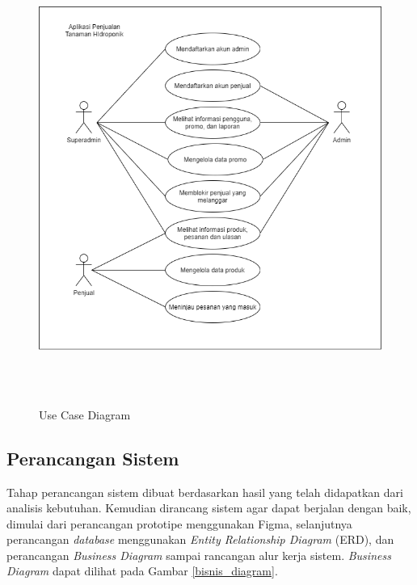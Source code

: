 \begin{figure}[H]
	\centering
	{\includegraphics [width = 14cm, height= 14cm]{gambar/use_case_diagram}}
	\caption{Use Case Diagram}
	\label{use_case_diagram}
\end{figure}

\subsection{Perancangan Sistem}
Tahap perancangan sistem dibuat berdasarkan hasil yang telah didapatkan dari analisis kebutuhan. Kemudian dirancang sistem agar dapat berjalan dengan baik, dimulai dari perancangan prototipe menggunakan Figma, selanjutnya perancangan \textit{database} menggunakan \textit{Entity Relationship Diagram} (ERD), dan perancangan \textit{Business Diagram} sampai rancangan alur kerja sistem. \textit{Business Diagram} dapat dilihat pada Gambar \ref{bisnis_diagram}.

